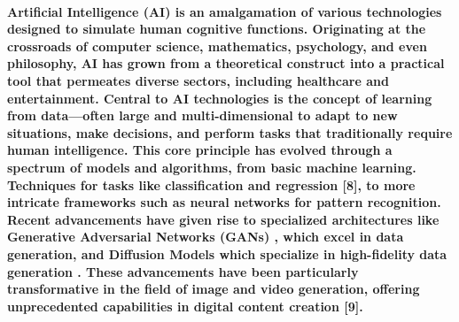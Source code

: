\documentclass[11pt,a4paper,oneside]{report}
\begin{document}
\paragraph{Artificial Intelligence (AI) is an amalgamation of various technologies designed to simulate human cognitive functions. 
Originating at the crossroads of computer science, mathematics, psychology, and even philosophy, 
AI has grown from a theoretical construct into a practical tool that permeates diverse sectors, 
including healthcare and entertainment. 
Central to AI technologies is the concept of learning from data—often large and multi-dimensional to adapt to new situations, 
make decisions, and perform tasks that traditionally require human intelligence. 
This core principle has evolved through a spectrum of models and algorithms, from basic machine learning. 
Techniques for tasks like classification and regression [8], to more intricate frameworks such as neural networks for pattern recognition. 
Recent advancements have given rise to specialized architectures like Generative Adversarial Networks (GANs) \cite{granot2022drop}, 
which excel in data generation, and Diffusion Models which specialize in high-fidelity data generation \cite{rombach2022high}. 
These advancements have been particularly transformative in the field of image and video generation, 
offering unprecedented capabilities in digital content creation [9].}
\end{document}
